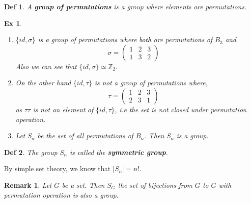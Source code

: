 \documentclass[paper=a4, fontsize=11pt]{scrartcl}
\newcommand{\nextline}{$ $ \newline \vspace{-0.15in}}
\newtheorem{definition}{Def}
\newtheorem{example}{Ex}
\newtheorem*{remark}{Remark}
\begin{document}
\begin{definition}
 A \textbf{group of permutations} is a group where elements are permutations.\\
\end{definition}

\begin{example}
\nextline
\begin{enumerate}
	\item $\{id , \sigma \}$ is a group of permutations where both are permutations of $B_3$ and 
	\begin{equation}\nonumber
		\sigma =
		\begin{pmatrix}
		1 & 2 & 3 \\
		1 & 3 & 2
		\end{pmatrix}
	\end{equation}
	Also we can see that $\{id,\sigma\} \simeq \mathbb{Z}_2$.\\
	\item On the other hand $\{id , \tau\}$ is not a group of permutations where, 
	\begin{equation}\nonumber
		\tau = 
		\begin{pmatrix}
		1 & 2 & 3 \\
		2 & 3 & 1 
		\end{pmatrix}
	\end{equation}
	as $\tau\tau$ is not an element of $\{id,\tau\}$, i.e the set is not closed under permutation operation.\\
	\item Let $S_n$ be the set of all permutations of $B_n$. Then $S_n$ is a group.\\
\end{enumerate}
\end{example}

\begin{definition}
	The group $S_n$ is called the \textbf{symmetric group}.\\
\end{definition}

By simple set theory, we know that $|S_n| = n!$.\\

\begin{remark}
	Let $G$ be a set. Then $S_G$ the set of bijections from $G$ to $G$ with permutation operation is also a group.\\
\end{remark}
\end{document}
